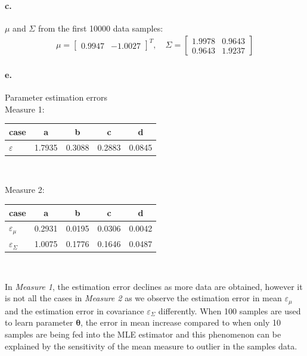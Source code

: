 \documentclass[a4paper]{article}
\begin{document}
\paragraph{c.} $\mu$ and $\Sigma$ from the first 10000 data samples: \\
\begin{align*}
	\mu = \begin{bmatrix}
		0.9947 & -1.0027
	\end{bmatrix}^{T}, \quad
	\Sigma = \begin{bmatrix}
		1.9978  &  0.9643 \\
		0.9643  &  1.9237
	\end{bmatrix}
\end{align*}

\paragraph{e.} Parameter estimation errors \\

Measure 1:
	\begin{tabular}{l *{4}{c}}
			case      &   a    &   b    &   c    &   d    \\ \hline
		$\varepsilon$ & 1.7935 & 0.3088 & 0.2883 & 0.0845
	\end{tabular} \\
\vspace{2em}
 
Measure 2:
	\begin{tabular}{l *{4}{c}}
				case            &   a    &   b    &   c    &   d    \\ \hline
		$\varepsilon _{\mu}$    & 0.2931 & 0.0195 & 0.0306 & 0.0042 \\ 
		$\varepsilon _{\Sigma}$ & 1.0075 & 0.1776 & 0.1646 & 0.0487 
	\end{tabular} \\
\vspace{2em}

In \emph{Measure 1}, the estimation error declines as more data are obtained, however it is not all the cases in \emph{Measure 2} as we observe the estimation error in mean $\varepsilon _{\mu}$ and the estimation error in covariance $\varepsilon _{\Sigma}$ differently. When 100 samples are used to learn parameter $\boldsymbol{\theta}$, the error in mean increase compared to when only 10 samples are being fed into the MLE estimator and this phenomenon can be explained by the sensitivity of the mean measure to outlier in the samples data.
\end{document}
